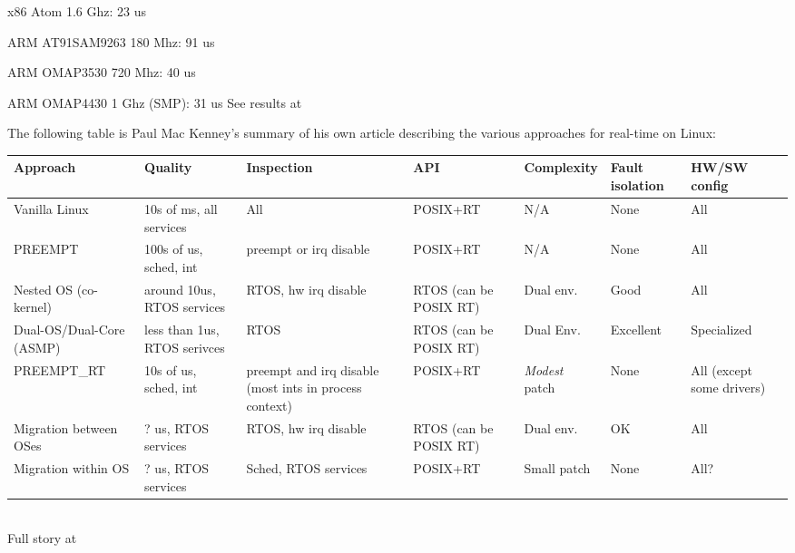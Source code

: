   \startitemize
  \item x86 Atom 1.6 Ghz: 23 us
  \item ARM AT91SAM9263 180 Mhz: 91 us
  \item ARM OMAP3530 720 Mhz: 40 us
  \item ARM OMAP4430 1 Ghz (SMP): 31 us
  \stopitemize
  See results at 

   The following table is Paul Mac
  Kenney's summary of his own article describing the various
  approaches for real-time on Linux:\\
  \vspace{0.3cm}
  \tiny
  \begin{tabular}{|p{1.2cm}|p{1.2cm}|p{1.2cm}|p{1.2cm}|p{1.2cm}|p{1.2cm}|p{1.2cm}|}
    \hline
    {\bf Approach} & {\bf Quality} & {\bf Inspection} & {\bf API} & {\bf Complexity} & {\bf Fault isolation} & {\bf HW/SW config} \\
    \hline
    Vanilla Linux & 10s of ms, all services & All & POSIX+RT & N/A & None & All \\
    \hline
    PREEMPT & 100s of us, sched, int & preempt or irq disable & POSIX+RT & N/A & None & All \\
    \hline
    Nested OS (co-kernel) & around 10us, RTOS services & RTOS, hw irq disable & RTOS (can be POSIX RT) & Dual env. & Good & All \\
    \hline
    Dual-OS/Dual-Core (ASMP) & less than 1us, RTOS serivces & RTOS & RTOS (can be POSIX RT) & Dual Env. & Excellent & Specialized \\
    \hline
    PREEMPT\_RT & 10s of us, sched, int & preempt and irq disable (most ints in process context) & POSIX+RT & {\em Modest} patch & None & All (except some drivers) \\
    \hline
    Migration between OSes & ? us, RTOS services & RTOS, hw irq disable & RTOS (can be POSIX RT) & Dual env. & OK & All \\
    \hline
    Migration within OS & ? us, RTOS services & Sched, RTOS services & POSIX+RT & Small patch & None & All? \\
    \hline
  \end{tabular}\\
  \vspace{0.3cm}
  Full story at 

